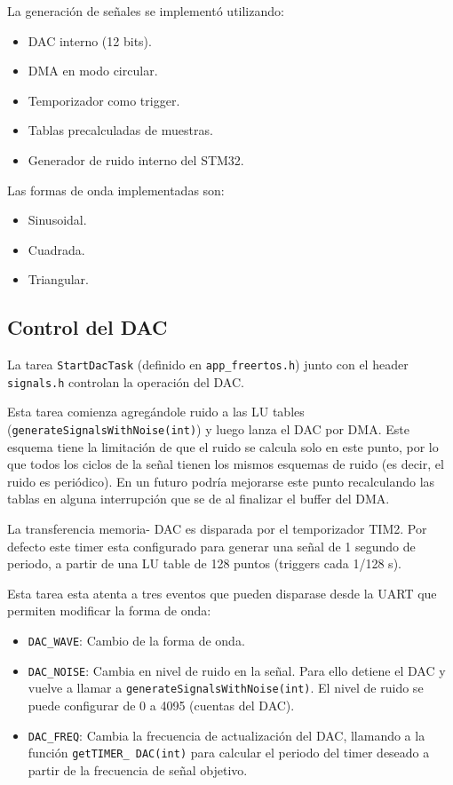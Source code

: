 \documentclass[a4paper,11pt]{article}
\begin{document}
La generación de señales se implementó utilizando:

\begin{itemize}
\item DAC interno (12 bits).
\item DMA en modo circular.
\item Temporizador como trigger.
\item Tablas precalculadas de muestras.
\item Generador de ruido interno del STM32.
\end{itemize}

Las formas de onda implementadas son:

\begin{itemize}
\item Sinusoidal.
\item Cuadrada.
\item Triangular.
\end{itemize}


\subsection{Control del DAC}

La tarea \texttt{StartDacTask} (definido en \texttt{app\_freertos.h}) junto con el header \texttt{signals.h} controlan la operación del DAC.

Esta tarea comienza agregándole ruido a las LU tables (\texttt{generateSignalsWithNoise(int)}) y luego lanza el DAC por DMA. Este esquema tiene la limitación de que el ruido se calcula solo en este punto, por lo que todos los ciclos de la señal tienen los mismos esquemas de ruido (es decir, el ruido es periódico). En un futuro podría mejorarse este punto recalculando las tablas en alguna interrupción que se de al finalizar el buffer del DMA. 

La transferencia memoria- DAC es disparada por el temporizador TIM2. Por defecto este timer esta configurado para generar una señal de 1 segundo de periodo, a partir de una LU table de 128 puntos (triggers cada 1/128 s). 

Esta tarea esta atenta a tres eventos que pueden disparase desde la UART que permiten modificar la forma de onda:

\begin{itemize}
	\item \texttt{DAC\_WAVE}: Cambio de la forma de onda.
	\item \texttt{DAC\_NOISE}: Cambia en nivel de ruido en la señal. Para ello detiene el DAC y vuelve a llamar a \texttt{generateSignalsWithNoise(int)}. El nivel de ruido se puede configurar de 0 a 4095 (cuentas del DAC).
	\item \texttt{DAC\_FREQ}: Cambia la frecuencia de actualización del DAC, llamando a la función \texttt{getTIMER\_ DAC(int)} para calcular el periodo del timer deseado a partir de la frecuencia de señal objetivo.
\end{itemize}
\end{document}
